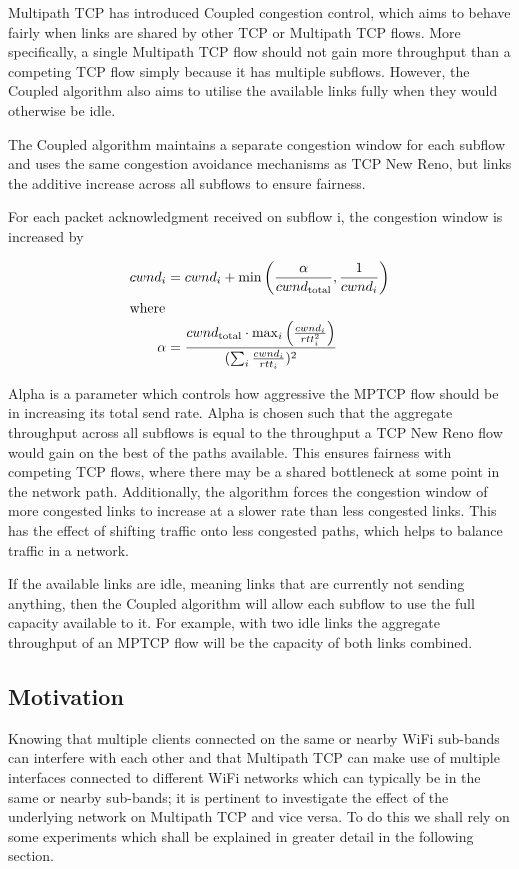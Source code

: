 Multipath TCP has introduced Coupled congestion control, which aims to behave 
fairly when links are shared by other TCP or Multipath TCP flows. More 
specifically, a single Multipath TCP flow should not gain more throughput than a 
competing TCP flow simply because it has multiple subflows. However, the Coupled 
algorithm also aims to utilise the available links fully when they would 
otherwise be idle.

The Coupled algorithm maintains a separate congestion window for each subflow
and uses the same congestion avoidance mechanisms as TCP New Reno, but links the
additive increase across all subflows to ensure fairness.

For each packet acknowledgment received on subflow i, the congestion window is
increased by

\begin{align*}
  cwnd_i &= cwnd_i +
    \min\left(\frac{\alpha}{cwnd_\text{total}}, \frac{1}{cwnd_i}\right) \\
  \intertext{where}
  \alpha &=
    \frac{cwnd_\text{total} \cdot \max_i\left(\frac{cwnd_i}{rtt_i^2}\right)}
         {(\sum_i \frac{cwnd_i}{rtt_i})^2}
\end{align*}

Alpha is a parameter which controls how aggressive the MPTCP flow should be in
increasing its total send rate. Alpha is chosen such that the aggregate
throughput across all subflows is equal to the throughput a TCP New Reno flow
would gain on the best of the paths available. This ensures fairness with
competing TCP flows, where there may be a shared bottleneck at some point in the
network path. Additionally, the algorithm forces the congestion window of more
congested links to increase at a slower rate than less congested links. This has
the effect of shifting traffic  onto less congested paths, which helps to
balance traffic in a network.

If the available links are idle, meaning links that are currently not sending 
anything, then the Coupled algorithm will allow each subflow to use the full 
capacity available to it. For example, with two idle links the aggregate 
throughput of an MPTCP flow will be the capacity of both links combined.

\subsection{Motivation}
Knowing that multiple clients connected on the same or nearby WiFi sub-bands 
can interfere with each other and that Multipath TCP can make use of multiple 
interfaces connected to different WiFi networks which can typically be in the 
same or nearby sub-bands; it is pertinent to investigate the effect of the 
underlying network on Multipath TCP and vice versa. To do this we shall rely on 
some experiments which shall be explained in greater detail in the following 
section.


